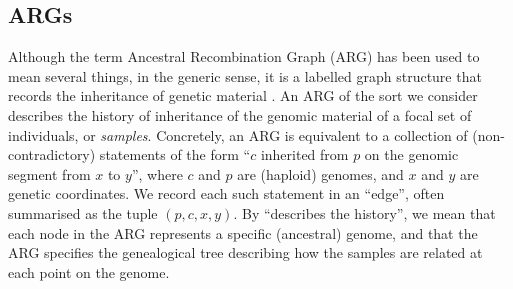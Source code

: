 \documentclass{article}
\begin{document}
\subsection*{ARGs} \label{par:recording}
Although the term Ancestral Recombination Graph (ARG) has been used to mean several things,
in the generic sense, it is a labelled graph structure that records
the inheritance of genetic material \citep{wong_general_2023}.
An ARG of the sort we consider describes the history of inheritance
of the genomic material of a focal set of individuals, or \emph{samples}.
Concretely, an ARG is equivalent to a collection of (non-contradictory) statements
of the form ``$c$ inherited from $p$ on the genomic segment from $x$ to $y$'',
where $c$ and $p$ are (haploid) genomes, and $x$ and $y$ are genetic coordinates.
We record each such statement in an ``edge'',
often summarised as the tuple $(p,c,x,y)$.
By ``describes the history'',
we mean that each node in the ARG represents a specific (ancestral) genome,
and that the ARG specifies the genealogical tree describing how the samples are related
at each point on the genome.
\end{document}
